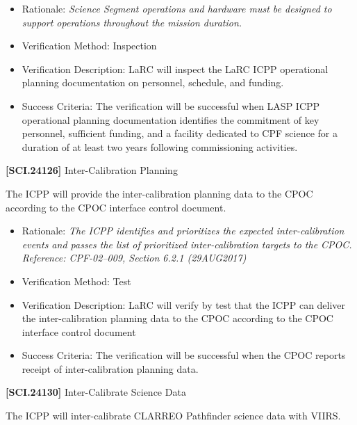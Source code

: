 \begin{itemize}
\item{} Rationale: \emph{Science Segment operations and hardware must be designed to support operations throughout the mission duration.}

\item{} Verification Method: Inspection

\item{} Verification Description: \gls{LaRC} will inspect the \gls{LaRC} \gls{ICPP} operational planning documentation on personnel, schedule, and funding.

\item{} Success Criteria: The verification will be successful when \gls{LASP} \gls{ICPP} operational planning documentation identifies the commitment of key personnel, sufficient funding, and a facility dedicated to \gls{CPF} science for a duration of at least two years following commissioning activities.

\end{itemize}

\textbf{[SCI.24126]} Inter-Calibration Planning

The \gls{ICPP} will provide the inter-calibration planning data to the \gls{CPOC} according to the \gls{CPOC} interface control document.

\begin{itemize}
\item{} Rationale: \emph{The ICPP identifies and prioritizes the expected inter-calibration events and passes the list of prioritized inter-calibration targets to the CPOC. Reference: CPF-02--009, Section 6.2.1 (29AUG2017)}

\item{} Verification Method: Test

\item{} Verification Description: \gls{LaRC} will verify by \gls{test} that the \gls{ICPP} can deliver the inter-calibration planning data to the \gls{CPOC} according to the \gls{CPOC} interface control document

\item{} Success Criteria: The verification will be successful when the \gls{CPOC} reports receipt of inter-calibration planning data.

\end{itemize}

\textbf{[SCI.24130]} Inter-Calibrate Science Data

The \gls{ICPP} will inter-calibrate \gls{CLARREO} Pathfinder science data with \gls{VIIRS}.

